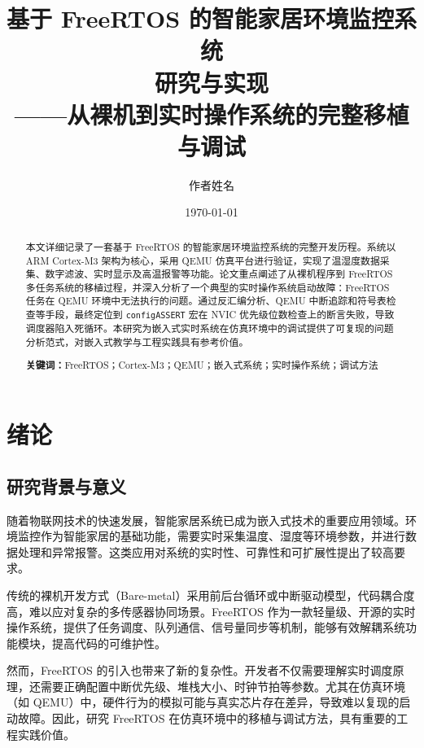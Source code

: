 \documentclass[12pt,a4paper]{ctexart}
\title{\textbf{基于 FreeRTOS 的智能家居环境监控系统\\研究与实现\\\large ——从裸机到实时操作系统的完整移植与调试}}
\author{作者姓名}
\date{\today}
\begin{document}
\maketitle
\thispagestyle{empty}
\newpage

\begin{abstract}
本文详细记录了一套基于 FreeRTOS 的智能家居环境监控系统的完整开发历程。系统以 ARM Cortex-M3 架构为核心，采用 QEMU 仿真平台进行验证，实现了温湿度数据采集、数字滤波、实时显示及高温报警等功能。论文重点阐述了从裸机程序到 FreeRTOS 多任务系统的移植过程，并深入分析了一个典型的实时操作系统启动故障：FreeRTOS 任务在 QEMU 环境中无法执行的问题。通过反汇编分析、QEMU 中断追踪和符号表检查等手段，最终定位到 \texttt{configASSERT} 宏在 NVIC 优先级位数检查上的断言失败，导致调度器陷入死循环。本研究为嵌入式实时系统在仿真环境中的调试提供了可复现的问题分析范式，对嵌入式教学与工程实践具有参考价值。

\textbf{关键词：}FreeRTOS；Cortex-M3；QEMU；嵌入式系统；实时操作系统；调试方法
\end{abstract}

\newpage

\tableofcontents
\newpage

\section{绪论}

\subsection{研究背景与意义}

随着物联网技术的快速发展，智能家居系统已成为嵌入式技术的重要应用领域。环境监控作为智能家居的基础功能，需要实时采集温度、湿度等环境参数，并进行数据处理和异常报警。这类应用对系统的实时性、可靠性和可扩展性提出了较高要求。

传统的裸机开发方式（Bare-metal）采用前后台循环或中断驱动模型，代码耦合度高，难以应对复杂的多传感器协同场景。FreeRTOS 作为一款轻量级、开源的实时操作系统，提供了任务调度、队列通信、信号量同步等机制，能够有效解耦系统功能模块，提高代码的可维护性。

然而，FreeRTOS 的引入也带来了新的复杂性。开发者不仅需要理解实时调度原理，还需要正确配置中断优先级、堆栈大小、时钟节拍等参数。尤其在仿真环境（如 QEMU）中，硬件行为的模拟可能与真实芯片存在差异，导致难以复现的启动故障。因此，研究 FreeRTOS 在仿真环境中的移植与调试方法，具有重要的工程实践价值。
\end{document}
